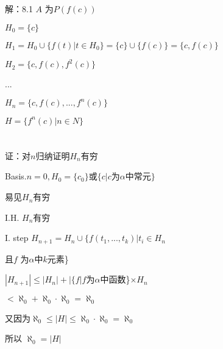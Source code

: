 \documentclass{article}
\begin{document}
\begin{CJK*}{UTF8}{gbsn}
解：8.1 $A$ 为$P(f(c))$

$H_0=\{c\}$

$H_1= H_0 \cup \{f(t)|t\in H_0\}= \{c\}\cup \{f(c)\} =\{c,f(c)\}$

$H_2=\{c,f(c),f^2(c)\}$

...

$H_n=\{c,f(c),...,f^n(c)\}$

$H=\{f^n(c)|n \in N\}$


\section{}
证：对$n$归纳证明$H_n$有穷

Basis.$n=0, H_0=\{c_0\}$或$\{c|c$为$\alpha$中常元$\}$

易见$H_n$有穷

I.H. $H_n$有穷

I. step $H_{n+1} = H_n \cup \{ f(t_1,...,t_k)|t_i \in H_n$

且$f$ 为$\alpha $中$k$元素\}

$|H_{n+1}| \leq |H_n| +|\{f|f$为$\alpha$中函数\}$\times H_n$

$< \aleph_0 +\aleph_0 \cdot \aleph_0 =\aleph_0$

又因为$\aleph_0\leq |H| \leq \aleph_0 \cdot \aleph_0 =\aleph_0$

所以 $\aleph_0 = |H|$



\end{CJK*}

\begin{CJK*}{UTF8}{bsmi}
\end{CJK*}
\end{document}

